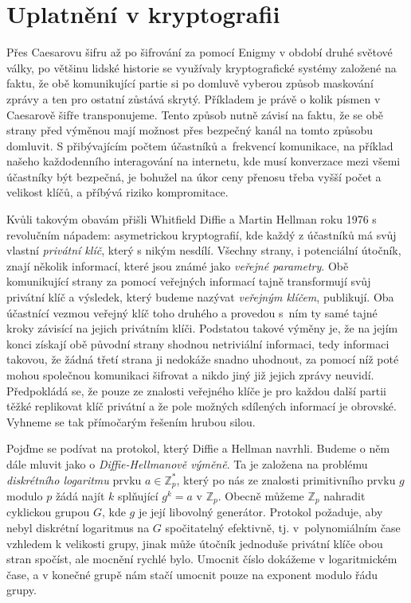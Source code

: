 \documentclass[12pt]{report}
\begin{document}
\chapter{Uplatnění v kryptografii}

Přes Caesarovu šifru až po šifrování za pomocí Enigmy v období druhé světové války, po většinu lidské historie se využívaly kryptografické systémy založené na faktu, že obě komunikující partie si po domluvě vyberou způsob maskování zprávy a ten pro ostatní zůstává skrytý. Příkladem je právě o kolik písmen v Caesarově šifře transponujeme. Tento způsob nutně závisí na faktu, že se obě strany před výměnou mají možnost přes bezpečný kanál na tomto způsobu domluvit. S přibývajícím počtem účastníků a~frekvencí komunikace, na příklad našeho každodenního interagování na internetu, kde musí konverzace mezi všemi účastníky být bezpečná, je bohužel na úkor ceny přenosu třeba vyšší počet a velikost klíčů, a příbývá riziko kompromitace.

Kvůli takovým obavám přišli Whitfield Diffie a Martin Hellman \cite{Diffie} roku 1976 s revolučním nápadem: asymetrickou kryptografií, kde každý z účastníků má svůj vlastní \textit{privátní klíč}, který s nikým nesdílí. Všechny strany, i potenciální útočník, znají několik informací, které jsou známé jako \textit{veřejné parametry}. Obě komunikující strany za pomocí veřejných informací tajně transformují svůj privátní klíč a výsledek, který budeme nazývat \textit{veřejným klíčem}, publikují. Oba účastnící vezmou veřejný klíč toho druhého a provedou s~ním ty samé tajné kroky závisící na jejich privátním klíči. Podstatou takové výměny je, že na jejím konci získají obě původní strany shodnou netriviální informaci, tedy informaci takovou, že žádná třetí strana ji nedokáže snadno uhodnout, za pomocí níž poté mohou společnou komunikaci šifrovat a nikdo jiný již jejich zprávy neuvidí. Předpokládá se, že pouze ze znalosti veřejného klíče je pro každou další partii těžké replikovat klíč privátní a že pole možných sdílených informací je obrovské. Vyhneme se tak přímočarým řešením hrubou silou.

Pojďme se podívat na protokol, který Diffie a Hellman navrhli. Budeme o něm dále mluvit jako o \textit{Diffie-Hellmanově výměně}. Ta je založena na problému \textit{diskrétního logaritmu} prvku $a \in \mathbb{Z}_p^{*}$, který po nás ze znalosti primitivního prvku $g$ modulo $p$ žádá najít $k$ splňující $g^k = a$ v $\mathbb{Z}_p$. Obecně můžeme $\mathbb{Z}_p$ nahradit cyklickou grupou $G$, kde $g$ je její libovolný generátor. Protokol požaduje, aby nebyl diskrétní logaritmus na $G$ spočitatelný efektivně, tj. v~polynomiálním čase vzhledem k velikosti grupy, jinak může útočník jednoduše privátní klíče obou stran spočíst, ale mocnění rychlé bylo. Umocnit číslo dokážeme v logaritmickém čase, a v konečné grupě nám stačí umocnit pouze na exponent modulo řádu grupy.
\end{document}
